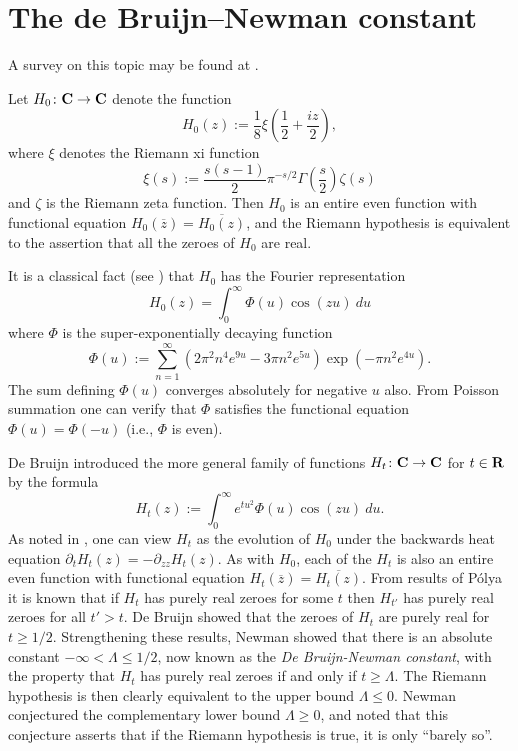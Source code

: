 \chapter{The de Bruijn--Newman constant}\label{debruijn-newman-chapter}

A survey on this topic may be found at \cite{newman-wu-survey}.

Let $H_0 \colon \mathbf{C} \to \mathbf{C}$ denote the function
\begin{equation}\label{hoz}
 H_0(z) := \frac{1}{8} \xi\left(\frac{1}{2} + \frac{iz}{2}\right),
\end{equation}
where $\xi$ denotes the Riemann xi function
\begin{equation}\label{sas}
 \xi(s) := \frac{s(s-1)}{2} \pi^{-s/2} \Gamma\left(\frac{s}{2}\right) \zeta(s)
\end{equation}
and $\zeta$ is the Riemann zeta function.
Then $H_0$ is an entire even function with functional equation $H_0(\overline{z}) = \overline{H_0(z)}$, and the Riemann hypothesis is equivalent to the assertion that all the zeroes of $H_0$ are real.

It is a classical fact (see \cite[p. 255]{titchmarsh_theory_1986}) that $H_0$ has the Fourier representation
$$ H_0(z) = \int_0^\infty \Phi(u) \cos(zu)\ du$$
where $\Phi$ is the super-exponentially decaying function
\begin{equation}\label{phidef}
 \Phi(u) := \sum_{n=1}^\infty (2\pi^2  n^4 e^{9u} - 3\pi n^2 e^{5u} ) \exp(-\pi n^2 e^{4u} ).
\end{equation}
The sum defining $\Phi(u)$ converges absolutely for negative $u$ also.  From Poisson summation one can verify that $\Phi$ satisfies the functional equation $\Phi(u) = \Phi(-u)$ (i.e., $\Phi$ is even).

De Bruijn \cite{debr} introduced the more general family of functions $H_t \colon \mathbf{C} \to \mathbf{C}$ for $t \in \mathbf{R}$ by the formula
\begin{equation}\label{htdef}
 H_t(z) := \int_0^\infty e^{tu^2} \Phi(u) \cos(zu)\ du.
\end{equation}
As noted in \cite[p.114]{csv}, one can view $H_t$ as the evolution of $H_0$ under the backwards heat equation $\partial_t H_t(z)= -\partial_{zz} H_t(z)$.
As with $H_0$, each of the $H_t$ is also an entire even function with functional equation $H_t(\overline{z}) = \overline{H_t(z)}$.  From results of P\'olya \cite{polya} it is known that if $H_t$ has purely real zeroes for some $t$ then $H_{t'}$ has purely real zeroes for all $t'>t$.
De Bruijn showed that the zeroes of $H_t$ are purely real for $t \geq 1/2$.  Strengthening these results, Newman \cite{newman} showed that there is an absolute constant $-\infty < \Lambda \leq 1/2$, now known as the \emph{De Bruijn-Newman constant}, with the property that $H_t$ has purely real zeroes if and only if $t \geq \Lambda$.  The Riemann hypothesis is then clearly equivalent to the upper bound $\Lambda \leq 0$.  Newman conjectured the complementary lower bound $\Lambda \geq 0$, and noted that this conjecture asserts that if the Riemann hypothesis is true, it is only ``barely so''.

